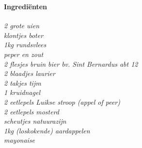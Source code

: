 \documentclass{article}
\newcommand{\sidebarsection}[1]{
    \large\textcolor{darkcol}{\textbf{#1}}
}
\newcommand{\ingredientitem}[1]{
    \vspace{3pt}
    \normalsize\emph{#1}
    \vspace{3pt}
}
\begin{document}
\begin{paracol}{2}
\begin{rightcolumn}
\sidebarsection{Ingrediënten} \\ \\
\ingredientitem{2 grote uien}\\ %
\ingredientitem{klontjes boter}\\ %
\ingredientitem{1kg rundsvlees}\\ %
\ingredientitem{peper en zout}\\ %
\ingredientitem{2 flesjes bruin bier bv. Sint Bernardus abt 12}\\ %
\ingredientitem{2 blaadjes laurier}\\ %
\ingredientitem{2 takjes tijm}\\ %
\ingredientitem{1 kruidnagel}\\ %
\ingredientitem{2 eetlepels Luikse stroop (appel of peer)}\\ %
\ingredientitem{2 eetlepels mosterd}\\ %
\ingredientitem{scheutjes natuurazijn}\\ %
\ingredientitem{1kg (loskokende) aardappelen}\\ %
\ingredientitem{mayonaise}\\ %

\newcommand{\hide}[1]
{}

\hide{
}

\end{rightcolumn}
\clearpage
\end{paracol}
\end{document}
